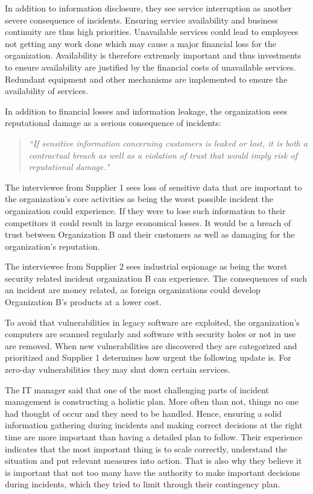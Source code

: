 In addition to information disclosure, they see service interruption as another severe consequence of incidents. Ensuring service availability and business continuity are thus high priorities. Unavailable services could lead to employees not getting any work done which may cause a major financial loss for the organization. Availability is therefore extremely important and thus investments to ensure availability are justified by the financial costs of unavailable services. Redundant equipment and other mechanisms are implemented to ensure the availability of services. 

In addition to financial losses and information leakage, the organization sees reputational damage as a serious consequence of incidents: 

\begin{quote}
\textit{``If sensitive information concerning customers is leaked or lost, it is both a contractual breach as well as a violation of trust that would imply risk of reputational damage."}
\end{quote}

The interviewee from Supplier 1 sees loss of sensitive data that are important to the organization's core activities as being the worst possible incident the organization could experience. If they were to lose such information to their competitors it could result in large economical losses. It would be a breach of trust between Organization B and their customers as well as damaging for the organization's reputation.	

The interviewee from Supplier 2 sees industrial espionage as being the worst security related incident organization B can experience. %
The consequences of such an incident are money related, as foreign organizations could develop Organization B's products at a lower cost. 

To avoid that vulnerabilities in legacy software are exploited, the organization's computers are scanned regularly and software with security holes or not in use are removed. When new vulnerabilities are discovered they are categorized and prioritized and Supplier 1 determines how urgent the following update is. For zero-day vulnerabilities they may shut down certain services.

The \acs{IT} manager said that one of the most challenging parts of incident management is constructing a holistic plan. More often than not, things no one had thought of occur and they need to be handled. Hence, ensuring a solid information gathering during incidents and making correct decisions at the right time are more important than having a detailed plan to follow. Their experience indicates that the most important thing is to scale correctly, understand the situation and put relevant measures into action. That is also why they believe it is important that not too many have the authority to make important decisions during incidents, which they tried to limit through their contingency plan.

